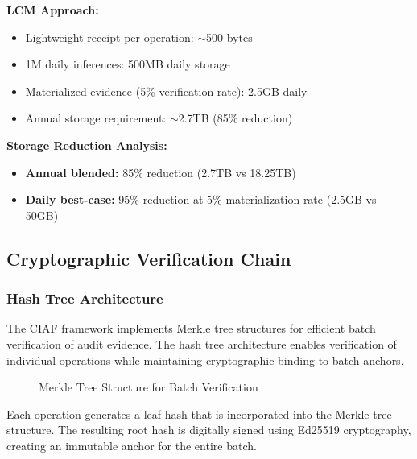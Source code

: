 \documentclass[12pt,a4paper]{article}
\begin{document}
\textbf{LCM Approach:}
\begin{itemize}
\item Lightweight receipt per operation: $\sim$500 bytes
\item 1M daily inferences: 500MB daily storage
\item Materialized evidence (5\% verification rate): 2.5GB daily
\item Annual storage requirement: $\sim$2.7TB (85\% reduction)
\end{itemize}

\textbf{Storage Reduction Analysis:}
\begin{itemize}
\item \textbf{Annual blended:} 85\% reduction (2.7TB vs 18.25TB)
\item \textbf{Daily best-case:} 95\% reduction at 5\% materialization rate (2.5GB vs 50GB)
\end{itemize}

\subsection{Cryptographic Verification Chain}

\subsubsection{Hash Tree Architecture}

The CIAF framework implements Merkle tree structures for efficient batch verification of audit evidence. The hash tree architecture enables verification of individual operations while maintaining cryptographic binding to batch anchors.

\begin{figure}[H]
\centering
{}
\caption{Merkle Tree Structure for Batch Verification}
\label{fig:merkle}
\end{figure}

Each operation generates a leaf hash that is incorporated into the Merkle tree structure. The resulting root hash is digitally signed using Ed25519 cryptography, creating an immutable anchor for the entire batch.
\end{document}

